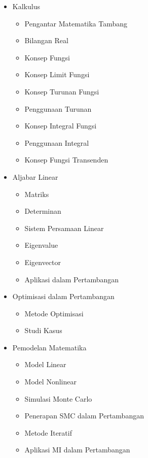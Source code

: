 \documentclass[
]{book}
\providecommand{\tightlist}{%
  \setlength{\itemsep}{0pt}\setlength{\parskip}{0pt}}
\begin{document}
\begin{itemize}
\tightlist
\item
  Kalkulus

  \begin{itemize}
  \tightlist
  \item
    Pengantar Matematika Tambang
  \item
    Bilangan Real
  \item
    Konsep Fungsi
  \item
    Konsep Limit Fungsi
  \item
    Konsep Turunan Fungsi
  \item
    Penggunaan Turunan
  \item
    Konsep Integral Fungsi
  \item
    Penggunaan Integral
  \item
    Konsep Fungsi Transenden
  \end{itemize}
\item
  Aljabar Linear

  \begin{itemize}
  \tightlist
  \item
    Matriks
  \item
    Determinan
  \item
    Sistem Persamaan Linear
  \item
    Eigenvalue
  \item
    Eigenvector
  \item
    Aplikasi dalam Pertambangan
  \end{itemize}
\item
  Optimisasi dalam Pertambangan

  \begin{itemize}
  \tightlist
  \item
    Metode Optimisasi
  \item
    Studi Kasus
  \end{itemize}
\item
  Pemodelan Matematika

  \begin{itemize}
  \tightlist
  \item
    Model Linear
  \item
    Model Nonlinear
  \item
    Simulasi Monte Carlo
  \item
    Penerapan SMC dalam Pertambangan
  \item
    Metode Iteratif
  \item
    Aplikasi MI dalam Pertambangan
  \end{itemize}
\end{itemize}
\end{document}
